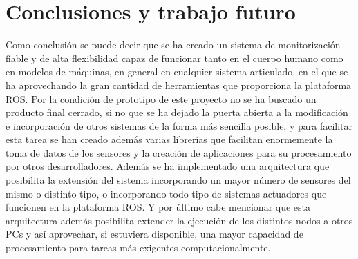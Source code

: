 \documentclass[12pt,a4paper]{article}
\begin{document}
\section{Conclusiones y trabajo futuro}

Como conclusión se puede decir que se ha creado un sistema de monitorización fiable y de alta flexibilidad capaz de funcionar tanto en el cuerpo humano como en modelos de máquinas, en general en cualquier sistema articulado, en el que se ha aprovechando la gran cantidad de herramientas que proporciona la plataforma ROS. Por la condición de prototipo de este proyecto no se ha buscado un producto final cerrado, si no que se ha dejado la puerta abierta a la modificación e incorporación de otros sistemas de la forma más sencilla posible, y para facilitar esta tarea se han creado además varias librerías que facilitan enormemente la toma de datos de los sensores y la creación de aplicaciones para su procesamiento por otros desarrolladores. Además se ha implementado una arquitectura que posibilita la extensión del sistema incorporando un mayor número de sensores del mismo o distinto tipo, o incorporando todo tipo de sistemas actuadores que funcionen en la plataforma ROS. Y por último cabe mencionar que esta arquitectura además posibilita extender la ejecución de los distintos nodos a otros PCs y así aprovechar, si estuviera disponible, una mayor capacidad de procesamiento para tareas más exigentes computacionalmente. 
\end{document}
